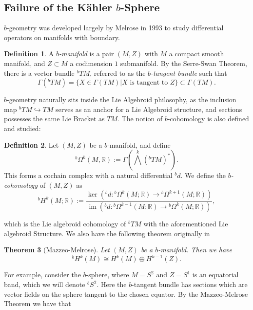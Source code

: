 \documentclass{amsart}
\newcommand{\R}{\mathbb{R}}
\newcommand{\ra}{\rightarrow}
\newtheorem{theorem}{Theorem}
\theoremstyle{definition}
\newtheorem{definition}[theorem]{Definition}
\theoremstyle{definition}
\DeclareMathOperator{\im}{im}
\begin{document}
\subsection{Failure of the Kähler $b$-Sphere}
 $b$-geometry was developed largely by Melrose in 1993 \cite{Melrose} to study differential operators on manifolds with boundary. 
\begin{definition}
    A \textit{$b$-manifold} is a pair $(M,Z)$ with $M$ a compact smooth manifold, and $Z \subset M$ a codimension $1$ submanifold. By the Serre-Swan Theorem, there is a vector bundle ${}^bTM$, referred to as the \textit{$b$-tangent bundle} such that 
    \begin{equation*}
        \Gamma({}^bTM) = \{ X \in \Gamma(TM) | X \text{ is tangent to }Z \} \subset \Gamma(TM).
    \end{equation*}
\end{definition}
$b$-geometry naturally sits inside the Lie Algebroid philosophy, as the inclusion map ${}^bTM \hookrightarrow TM$ serves as an anchor for a Lie Algebroid structure, and sections possesses the same Lie Bracket as $TM$. The notion of $b$-cohomology is also defined and studied:
\begin{definition}
    Let $(M,Z)$ be a $b$-manifold, and define 
    \begin{equation*}
        {}^b\Omega^k(M,\R) := \Gamma\left( \bigwedge^k ({}^b TM)^*\right).
    \end{equation*}
    This forms a cochain complex with a natural differential ${}^bd$. We define the \textit{$b$-cohomology} of $(M,Z)$ as 
    \begin{equation*}
        {}^bH^k(M;\R) := \frac{\ker({}^bd:{}^b\Omega^k(M;\R) \ra {}^b\Omega^{k+1}(M;\R))}{\im({}^bd:{}^b\Omega^{k-1}(M;\R) \ra {}^b\Omega^{k}(M;\R))},
    \end{equation*}
\end{definition}
which is the Lie algebroid cohomology  of ${}^bTM$ with the aforementioned Lie algebroid Structure. We also have the following theorem originally in \cite[Section 2.16]{Melrose}
\begin{theorem}[Mazzeo-Melrose]
    Let $(M,Z)$ be a $b$-manifold. Then we have
    \begin{equation*}
        {}^bH^k(M) \cong H^k(M) \oplus H^{k-1}(Z).
    \end{equation*}
\end{theorem}
For example, consider the $b$-sphere, where $M=S^2$ and $Z=S^1$ is an equatorial band, which we will denote ${}^bS^2$. Here the $b$-tangent bundle has sections which are vector fields on the sphere tangent to the chosen equator. By the Mazzeo-Melrose Theorem we have that
\end{document}
